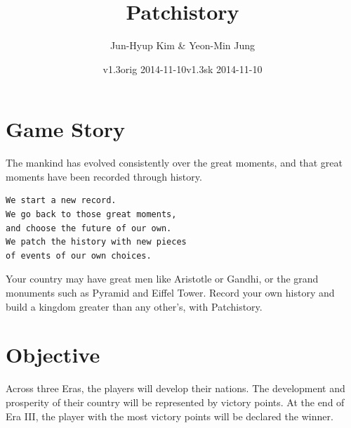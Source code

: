 \documentclass[10pt,twocolumn]{article}
\title{\textbf{Patchistory}}
\author{Jun-Hyup Kim \& Yeon-Min Jung}
\date{v1.3orig 2014-11-10}
\date{v1.3sk 2014-11-10}
\begin{document}
\newenvironment{BoxExample}%
{\begin{titled-frame}{Example}\noindent\ignorespaces}%
{\par\noindent\ignorespacesafterend\end{titled-frame}}
\newcommand\statExplain[2]{\begin{framed}{\noindent\textit{ #1 = #2}}\end{framed}}
\newcommand\eraCost[3]{[#1/#2/#3]}
\newcommand\myAction[1]{\texttt{#1}}
\newcommand\myPhase[1]{\textit{#1}}
\newcommand\tra{Transport Level (TRA)}
\newcommand\mil{Military Force (MIL)}
\newcommand\pol{Political Influence (POL)}
\newcommand\polf{Political Favours}
\newcommand\inlineImage[2][\linewidth]{\centerline{\texttt{[image: ../../imgs/\#2.jpg]}}}
\newcommand\actionCost[2]{#1 (#2):}
\newcommand\compHead[1]{\subsection*{#1}}
\newcommand\floatingImage[3][\linewidth]{\begin{figure}\centering\texttt{[image: ../../imgs/\#3.jpg]}\caption{#2}\end{figure}}
\maketitle
\tableofcontents
\section{Game Story}
The mankind has evolved consistently over the great moments, and that great moments have been recorded through history.
\begin{verbatim}We start a new record.
We go back to those great moments,
and choose the future of our own.
We patch the history with new pieces
of events of our own choices.\end{verbatim}
Your country may have great men like Aristotle or Gandhi, or the grand monuments such as Pyramid and Eiffel Tower. Record your own history and build a kingdom greater than any other's, with Patchistory.
\section{Objective}
Across three Eras, the players will develop their nations. The development and prosperity of their country will be represented by victory points. At the end of Era III, the player with the most victory points will be declared the winner.
\end{document}

